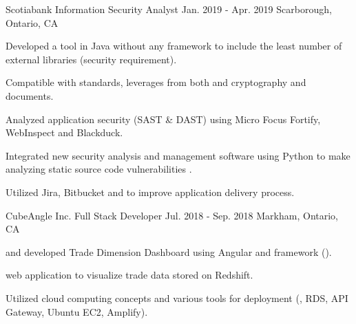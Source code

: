 \begin{cventries}
  \cventry
    {Scotiabank} %
    {Information Security Analyst} %
    {Jan. 2019 - Apr. 2019} %
    {Scarborough, Ontario, CA} %
    {
      \begin{cvitems} %
        \item {Developed a  tool in Java without any framework to include the least number of external libraries (security requirement).}
          \begin{cvsubitems}
            \item {Compatible with  standards, leverages from both  and  cryptography and  documents.}
          \end{cvsubitems}
        \item {Analyzed application security (SAST \& DAST) using Micro Focus Fortify, WebInspect and Blackduck.}
        \item {Integrated new security analysis and management software using Python to make analyzing static source code vulnerabilities .}
          \begin{cvsubitems}
            \item {Utilized Jira, Bitbucket and  to improve application delivery process.}
          \end{cvsubitems}
      \end{cvitems}
    }

  \cventry
    {CubeAngle Inc.} %
    {Full Stack Developer} %
    {Jul. 2018 - Sep. 2018} %
    {Markham, Ontario, CA} %
    {
      \begin{cvitems} %
        \item { and developed Trade Dimension Dashboard using Angular and  framework ().}
          \begin{cvsubitems}
            \item { web application to visualize trade data stored on  Redshift.}
          \end{cvsubitems}
        \item {Utilized cloud computing concepts and various  tools for deployment (, RDS, API Gateway, Ubuntu EC2, Amplify).}
      \end{cvitems}
    }


\end{cventries}
